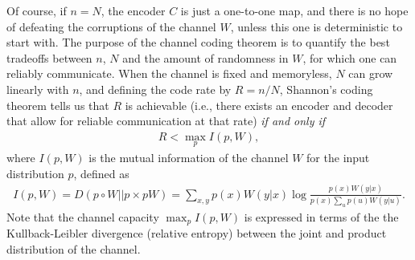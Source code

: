 \documentclass[11pt]{article}
\newcommand{\1}{\mathbb{1}}
\begin{document}
Of course, if $n=N$, the encoder $C$ is just a one-to-one map, and there is no hope of defeating the corruptions of the channel $W$, unless this one is deterministic to start with. The purpose of the channel coding theorem is to quantify the best tradeoffs between $n$, $N$ and the amount of randomness in $W$, for which one can reliably communicate. When the channel is fixed and memoryless, $N$ can grow linearly with $n$, and defining the code rate by $R=n/N$, Shannon's coding theorem tells us that $R$ is achievable (i.e., there exists an encoder and decoder that allow for reliable communication at that rate) {\it if and only if}
\begin{align}
R < \max_p I(p,W),
\end{align}
where $I(p,W)$ is the mutual information of the channel $W$ for the input distribution $p$, defined as 
\begin{align}
I(p,W) = D(p \circ W||p \times pW) = \sum_{x,y} p(x) W(y|x)  \log \frac{p(x) W(y|x)}{p(x) \sum_u p(u)W(y|u)}.
\end{align}
Note that the channel capacity $\max_p I(p,W)$ is expressed in terms of the the Kullback-Leibler divergence (relative entropy) between the joint and product distribution of the channel. 
\end{document}
